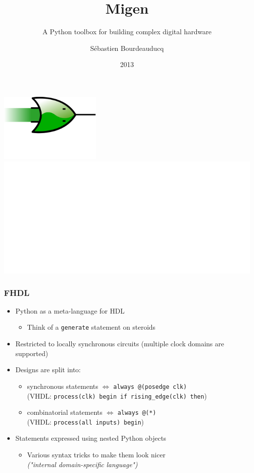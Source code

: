 \documentclass[serif,mathserif]{beamer}
\author{S\'ebastien Bourdeauducq}
\title{Migen}
\subtitle{A Python toolbox for building complex digital hardware}
\date{2013}
\begin{document}
\maketitle

\begin{frame}
\begin{centering}
\includegraphics[width=5cm]{migen_logo.png} \\
\includegraphics[width=\textwidth]{migenblock.png}
\end{centering}
\end{frame}

\begin{frame}[fragile]
\frametitle{FHDL}
\begin{itemize}
\item Python as a meta-language for HDL
\begin{itemize}
\item Think of a \verb!generate! statement on steroids
\end{itemize}
\item Restricted to locally synchronous circuits (multiple clock domains are supported)
\item Designs are split into:
\begin{itemize}
\item synchronous statements $\Longleftrightarrow$ \verb!always @(posedge clk)! \\
(VHDL: \verb!process(clk) begin if rising_edge(clk) then!)
\item combinatorial statements $\Longleftrightarrow$ \verb!always @(*)! \\
(VHDL: \verb!process(all inputs) begin!)
\end{itemize}
\item Statements expressed using nested Python objects
\begin{itemize}
\item Various syntax tricks to make them look nicer \\
\textit{("internal domain-specific language")}
\end{itemize}
\end{itemize}
\end{frame}
\end{document}
